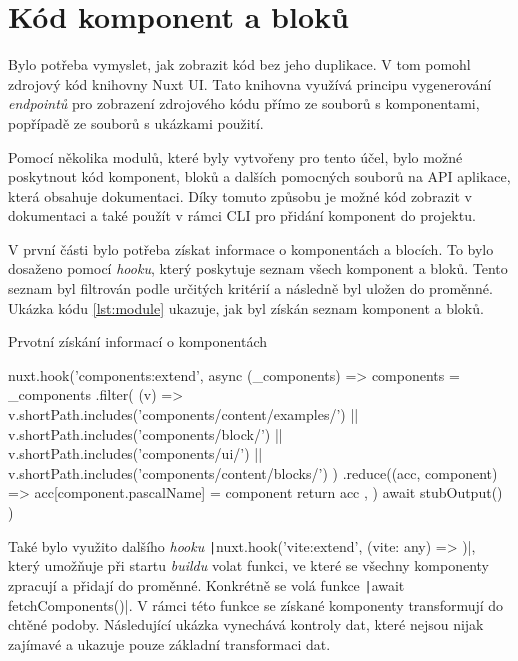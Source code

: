 \clearpage

\section{Kód komponent a bloků}
Bylo potřeba vymyslet, jak zobrazit kód bez jeho duplikace. V tom pomohl zdrojový kód knihovny Nuxt UI. Tato knihovna využívá principu vygenerování \emph{endpointů} pro zobrazení zdrojového kódu přímo ze souborů s komponentami, popřípadě ze souborů s ukázkami použití. \cite{NuxtUISourceCodeModule}

Pomocí několika modulů, které byly vytvořeny pro tento účel, bylo možné poskytnout kód komponent, bloků a dalších pomocných souborů na API aplikace, která obsahuje dokumentaci. Díky tomuto způsobu je možné kód zobrazit v dokumentaci a také použít v rámci CLI pro přidání komponent do projektu.

V první části bylo potřeba získat informace o komponentách a blocích. To bylo dosaženo pomocí \emph{hooku}, který poskytuje seznam všech komponent a bloků. Tento seznam byl filtrován podle určitých kritérií a následně byl uložen do proměnné. Ukázka kódu \ref{lst:module} ukazuje, jak byl získán seznam komponent a bloků.

\begin{listing}[H]
    \caption{Prvotní získání informací o komponentách}
    \label{lst:module}
    \begin{code}
nuxt.hook('components:extend', async (_components) => {
    components = _components
        .filter(
        (v) =>
            v.shortPath.includes('components/content/examples/') ||
            v.shortPath.includes('components/block/') ||
            v.shortPath.includes('components/ui/') ||
            v.shortPath.includes('components/content/blocks/')
        )
        .reduce((acc, component) => {
        acc[component.pascalName] = component
        return acc
        }, {})
    await stubOutput()
})
\end{code}
\end{listing}

Také bylo využito dalšího \emph{hooku} \texttt|nuxt.hook('vite:extend', (vite: any) => {})|, který umožňuje při startu \emph{buildu} volat funkci, ve které se všechny komponenty zpracují a přidají do proměnné. Konkrétně se volá funkce \texttt|await fetchComponents()|. V rámci této funkce se získané komponenty transformují do chtěné podoby. Následující ukázka vynechává kontroly dat, které nejsou nijak zajímavé a ukazuje pouze základní transformaci dat.

